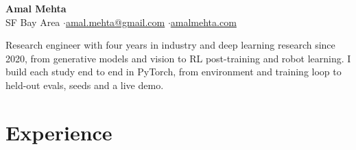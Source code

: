 \documentclass[10pt]{article}
\begin{document}
\fontsize{9.8}{10.5}\selectfont

\begin{center}
{\LARGE\bfseries Amal Mehta}\\[3pt]
SF Bay Area \quad$\cdot$\quad \href{mailto:amal.mehta@gmail.com}{amal.mehta@gmail.com} \quad$\cdot$\quad \href{https://amalmehta.com/}{amalmehta.com}
\end{center}

Research engineer with four years in industry and deep learning research since 2020, from generative models and vision to RL post-training and robot learning. I build each study end to end in PyTorch, from environment and training loop to held-out evals, seeds and a live demo.

\section*{Experience}
\end{document}
